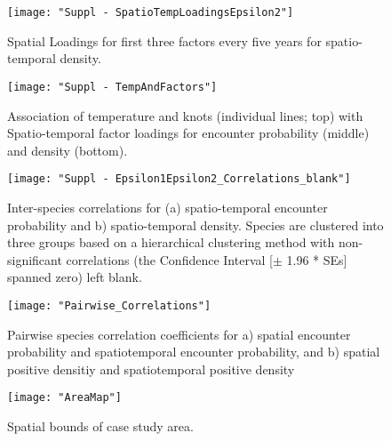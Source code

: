 \documentclass{article}
\begin{document}
\begin{figure}[!ht]
\begin{center}
	\texttt{[image: "Suppl - SpatioTempLoadingsEpsilon2"]}
	\label{fig:S7}
	\caption{Spatial Loadings for first three factors every five years for
	spatio-temporal density.}
	\end{center}
\end{figure}


\begin{figure}[!ht]
\begin{center}
	\texttt{[image: "Suppl - TempAndFactors"]}
	\label{fig:S6}
	\caption{Association of temperature and knots (individual lines; top)
		with Spatio-temporal factor loadings for encounter probability
	(middle) and density (bottom).}
	\end{center}
\end{figure}



\begin{figure}[!ht]
\begin{center}
	\texttt{[image: "Suppl - Epsilon1Epsilon2\_Correlations\_blank"]}
	\label{fig:S8}
	\caption{Inter-species correlations for (a) spatio-temporal encounter
		probability and b) spatio-temporal density. Species are
		clustered into three groups based on a hierarchical clustering
		method with non-significant correlations (the Confidence
		Interval [$\pm$ 1.96 * SEs] spanned zero) left blank.}
	\end{center}
\end{figure}

\begin{figure}[!ht]
\begin{center}
	\texttt{[image: "Pairwise\_Correlations"]}
	\label{fig:S9}
	\caption{Pairwise species correlation coefficients for a) spatial
		encounter probability and spatiotemporal encounter probability,
	and b) spatial positive densitiy and spatiotemporal positive density}
	\end{center}
\end{figure}


\begin{figure}[!ht]
\begin{center}
	\texttt{[image: "AreaMap"]}
	\label{fig:S10}
	\caption{Spatial bounds of case study area.}
	\end{center}
\end{figure}
\end{document}
